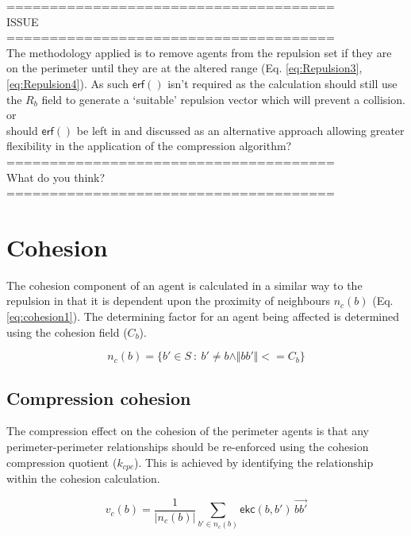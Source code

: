 \documentclass[12pt,a4paper]{article}
\newcommand{\magn}[1]{\Vert{#1}\Vert}
\begin{document}
\noindent======================================\\
ISSUE\\
======================================\\
The methodology applied is to remove agents from the repulsion set if they are on the perimeter until they are at the altered range (Eq. \ref{eq:Repulsion3},\ref{eq:Repulsion4}). As such $\mathsf{erf()}$ isn't required as the calculation should still use the $R_b$ field to generate a `suitable' repulsion vector which will prevent a collision.\\
or\\
should $\mathsf{erf()}$ be left in and discussed as an alternative approach allowing greater flexibility in the application of the compression algorithm?\\
======================================\\
What do you think?\\
======================================\\

\section{Cohesion}\label{cohesion}

The cohesion component of an agent is calculated in a similar way to the repulsion in that it is dependent upon the proximity of neighbours $n_c(b)$ (Eq. \ref{eq:cohesion1}). The determining factor for an agent being affected is determined using the cohesion field ($C_b$).

\begin{equation}\label{eq:cohesion1}
n_c(b) = \{b' \in S~:~b' \neq b \land\magn{bb'} <= C_b\}
\end{equation}

\subsection{Compression cohesion}
The compression effect on the cohesion of the perimeter agents is that any perimeter-perimeter relationships should be re-enforced using the cohesion compression quotient ($k_{cpc}$). This is achieved by identifying the relationship within the cohesion calculation.

\begin{equation}\label{eq:cohesion2}
v_c(b) = \frac{1}{\lvert n_c(b)\rvert} \sum_{b' \in n_c(b)}\mathsf{ekc}(b, b')\, \vec{b b'}
\end{equation}
\end{document}
